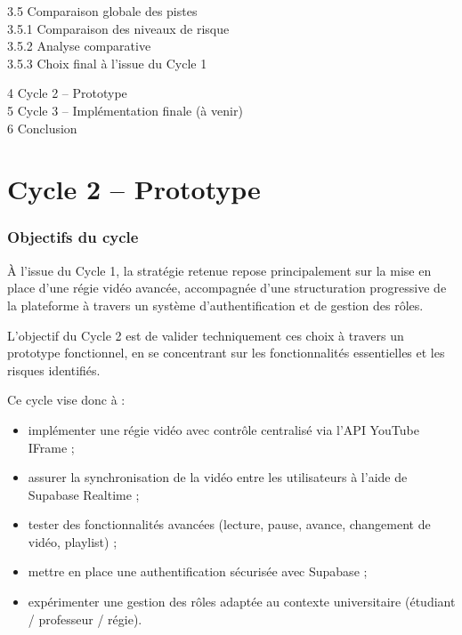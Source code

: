 \documentclass[12pt,a4paper]{report}
\begin{document}
\vspace{0.2cm}
\hspace*{0.8cm}\textcolor{orangeil}{3.5 Comparaison globale des pistes} \\
\hspace*{1.6cm}3.5.1 Comparaison des niveaux de risque \\
\hspace*{1.6cm}3.5.2 Analyse comparative \\
\hspace*{1.6cm}3.5.3 Choix final à l’issue du Cycle 1 

\vspace{0.4cm}
\noindent
\textcolor{orangeil}{4 Cycle 2 -- Prototype} \\
\textcolor{orangeil}{5 Cycle 3 -- Implémentation finale (à venir)} \\
\textcolor{orangeil}{6 Conclusion} 

\newpage

\newpage
\chapter{Cycle 2 -- Prototype}
\label{sec:cycle2}

\subsection{Objectifs du cycle}

À l’issue du Cycle 1, la stratégie retenue repose principalement sur la mise en
place d’une régie vidéo avancée, accompagnée d’une structuration progressive
de la plateforme à travers un système d’authentification et de gestion des rôles.

L’objectif du Cycle 2 est de valider techniquement ces choix à travers un
prototype fonctionnel, en se concentrant sur les fonctionnalités essentielles
et les risques identifiés.

Ce cycle vise donc à :
\begin{itemize}
  \item implémenter une régie vidéo avec contrôle centralisé via l’API YouTube IFrame ;
  \item assurer la synchronisation de la vidéo entre les utilisateurs à l’aide de Supabase Realtime ;
  \item tester des fonctionnalités avancées (lecture, pause, avance, changement de vidéo, playlist) ;
  \item mettre en place une authentification sécurisée avec Supabase ;
  \item expérimenter une gestion des rôles adaptée au contexte universitaire (étudiant / professeur / régie).
\end{itemize}
\end{document}
